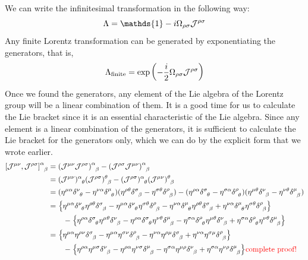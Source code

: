 We can write the infinitesimal transformation in the following way:
$$\Lambda = \mathds{1} -i \Omega_{\rho\sigma}\SJ^{\rho\sigma}$$
Any finite Lorentz transformation can be generated by exponentiating the generators, that is, 
$$\Lambda_{\mathrm{finite}} = \exp\qty(-\frac{i}{2}\Omega_{\rho\sigma}\mathcal J^{\rho\sigma})$$
Once we found the generators, any element of the Lie algebra of the Lorentz group will be a linear combination of them. It is a good time for us to calculate the Lie bracket since it is an essential characteristic of the Lie algebra. Since any element is a linear combination of the generators, it is sufficient to calculate the Lie bracket for the generators only, which we can do by the explicit form that we wrote earlier. 
\begin{align*}
    \tensor{{\comtr{\SJ^{\mu\nu}}{\SJ^{\rho\sigma}}}}{^\alpha _\beta} &=  \tensor{\qty({{\SJ^{\mu\nu}}{\SJ^{\rho\sigma}}})}{^\alpha _\beta} - \tensor{\qty({{\SJ^{\rho\sigma}}{\SJ^{\mu\nu}}})}{^\alpha _\beta}\\
    &=\tensor{(\SJ^{\mu\nu})}{^\alpha _\theta}\tensor{(\SJ^{\rho\sigma})}{^\theta _\beta} -\tensor{(\SJ^{\rho\sigma})}{^\alpha _\theta}\tensor{(\SJ^{\mu\nu})}{^\theta _\beta}\\
    &=( \eta^{\mu\alpha} \tensor{\delta}{^\nu _\theta} - \eta^{\nu\alpha} \tensor{\delta}{^\mu _\theta})( \eta^{\rho\theta} \tensor{\delta}{^\sigma _\beta} - \eta^{\sigma\theta} \tensor{\delta}{^\rho _\beta}) -  ( \eta^{\rho\alpha} \tensor{\delta}{^\sigma _\theta} - \eta^{\sigma\alpha} \tensor{\delta}{^\rho _\theta}) ( \eta^{\mu\theta} \tensor{\delta}{^\nu _\beta} - \eta^{\nu\theta} \tensor{\delta}{^\mu _\beta})\\
    &=\qty{\eta^{\mu\alpha} \tensor{\delta}{^\nu _\theta} \eta^{\rho\theta} \tensor{\delta}{^\sigma _\beta}  - \eta^{\mu\alpha} \tensor{\delta}{^\nu _\theta}\eta^{\sigma\theta} \tensor{\delta}{^\rho _\beta} -\eta^{\nu\alpha} \tensor{\delta}{^\mu _\theta}\eta^{\rho\theta} \tensor{\delta}{^\sigma _\beta} +\eta^{\nu\alpha} \tensor{\delta}{^\mu _\theta}\eta^{\sigma\theta} \tensor{\delta}{^\rho _\beta}} \\
    & \qquad - \qty{\eta^{\rho\alpha} \tensor{\delta}{^\sigma _\theta}\eta^{\mu\theta} \tensor{\delta}{^\nu _\beta}    -  \eta^{\rho\alpha} \tensor{\delta}{^\sigma _\theta}\eta^{\nu\theta} \tensor{\delta}{^\mu _\beta} -\eta^{\sigma\alpha} \tensor{\delta}{^\rho _\theta}\eta^{\mu\theta} \tensor{\delta}{^\nu _\beta}    + \eta^{\sigma\alpha} \tensor{\delta}{^\rho _\theta}\eta^{\nu\theta} \tensor{\delta}{^\mu _\beta}} \\
    &=\qty{\eta^{\mu\alpha}  \eta^{\rho\nu} \tensor{\delta}{^\sigma _\beta}  - \eta^{\mu\alpha} \eta^{\sigma\nu} \tensor{\delta}{^\rho _\beta} -\eta^{\nu\alpha} \eta^{\rho\mu} \tensor{\delta}{^\sigma _\beta} +\eta^{\nu\alpha}\eta^{\sigma\mu} \tensor{\delta}{^\rho _\beta}} \\ &\qquad - \qty{\eta^{\rho\alpha} \eta^{\mu\sigma} \tensor{\delta}{^\nu _\beta}    -  \eta^{\rho\alpha} \eta^{\nu\sigma} \tensor{\delta}{^\mu _\beta} -\eta^{\sigma\alpha}\eta^{\mu\rho} \tensor{\delta}{^\nu _\beta}    + \eta^{\sigma\alpha} \eta^{\nu\rho} \tensor{\delta}{^\mu _\beta}} \textcolor{red}{\text{complete proof!}}
\end{align*}

